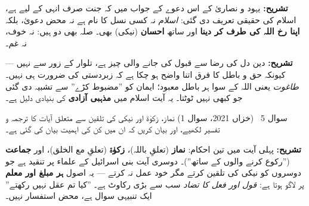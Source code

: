 \begin{hal}

\smallskip
\textbf{تشریح:} یہود و نصاریٰ کے اس دعوے کے جواب میں کہ جنت صرف انہی کے لیے
ہے، اسلام کی حقیقی تعریف دی گئی: \emph{اسلام} نہ کسی نسل کا نام ہے نہ محض
دعویٰ، بلکہ \textbf{اپنا رخ اللہ کی طرف کر دینا} اور ساتھ \textbf{احسان}
(نیکی) بھی۔ صلہ بھی دو ہیں: نہ خوف، نہ غم۔

\medskip
{}

\smallskip
\textbf{تشریح:} دین دل کی رضا سے قبول کی جانے والی چیز ہے، تلوار کے زور سے
نہیں --- کیونکہ حق و باطل کا فرق اتنا واضح ہو چکا ہے کہ زبردستی کی ضرورت ہی
نہیں۔ \emph{طاغوت} یعنی اللہ کے سوا ہر باطل معبود؛ ایمان کو ''مضبوط کڑے''
سے تشبیہ دی گئی جو کبھی نہیں ٹوٹتا۔ یہ آیت اسلام میں \textbf{مذہبی آزادی} کی
بنیادی دلیل ہے۔
\end{hal}

\begin{sawal}{سوال \textenglish{5} \ \textnormal{\small(خزاں \textenglish{2021}، سوال \textenglish{1})}}
نماز، زکوٰۃ اور نیکی کی تلقین سے متعلق آیات کا ترجمہ و تفسیر لکھیے، اور بیان
کریں کہ ان میں کن کی اہمیت بیان کی گئی ہے۔
\end{sawal}

\begin{hal}

\medskip
\textbf{تشریح:} پہلی آیت میں تین احکام: \textbf{نماز} (تعلقِ باللہ)،
\textbf{زکوٰۃ} (تعلقِ مع الخلق)، اور \textbf{جماعت} (''رکوع کرنے والوں کے
ساتھ'')۔ دوسری آیت بنی اسرائیل کے علماء پر تنقید ہے جو دوسروں کو نیکی کی
تلقین کرتے مگر خود عمل نہ کرتے --- یہ اصول \textbf{ہر مبلغ اور معلم} پر لاگو
ہوتا ہے: \emph{قول اور فعل کا تضاد} سب سے بڑی رکاوٹ ہے۔ ''کیا تم عقل نہیں
رکھتے'' ایک تنبیہی سوال ہے، محض استفسار نہیں۔
\end{hal}

